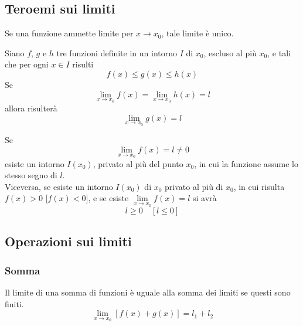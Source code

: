\subsection{Teroemi sui limiti}
\begin{uniLim}\hypertarget{teor:uniLim}{}
	Se una funzione ammette limite per $x\to x_0$, tale limite è unico.
\end{uniLim}
\begin{confrontoLim}\hypertarget{teor:confLim}{}
	Siano $f$, $g$ e $h$ tre funzioni definite in un intorno $I$ di $x_0$, escluso al più $x_0$, e tali
	che per ogni $x\in I$ risulti
	\begin{equation*}
	f(x)\leq g(x)\leq h(x)
	\end{equation*}
	Se
	\begin{equation*}
	\lim\limits_{x\to x_0} f(x) = \lim\limits_{x\to x_0} h(x) = l
	\end{equation*}
	allora risulterà
	\begin{equation*}
	\lim\limits_{x\to x_0}g(x)=l
	\end{equation*}
\end{confrontoLim}
\begin{permanenzaSegno}\hypertarget{teor:segno}{}
	Se
	\begin{equation*}
	\lim\limits_{x\to x_0}f(x)=l\neq0
	\end{equation*}
	esiste un intorno $I(x_0)$, privato al più del punto $x_0$, in cui la funzione assume lo stesso 
	segno di $l$.\\
	Viceversa, se esiste un intorno $I(x_0)$ di $x_0$ privato al più di $x_0$, in cui risulta $f(x)>0$
	[$f(x)<0$], e se esiste $\lim\limits_{x\to x_0}f(x)=l$ si avrà
	\begin{equation*}
	l\geq0\quad[l\leq0]
	\end{equation*}
\end{permanenzaSegno}

\subsection{Operazioni sui limiti}
\subsubsection{Somma}
\begin{sommaLimiti}\hypertarget{teor:sommaLimiti}{}
	Il limite di una somma di funzioni è uguale alla somma dei limiti se questi sono finiti.
	\begin{equation*}
	\lim\limits_{x\to x_0}[f(x)+g(x)] = l_1+l_2
	\end{equation*}
\end{sommaLimiti}

